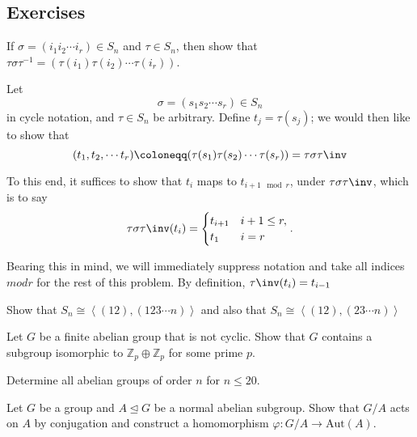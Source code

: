 \subsection{Exercises}

\begin{problem}[Hungerford 1.6.3]
If $\sigma = (i_1 i_2 \cdots i_r) \in S_n$ and $\tau \in S_n$, then show that $\tau\sigma\tau^{-1} = (\tau(i_1) \tau(i_2) \cdots \tau(i_r))$.
\end{problem}

\begin{solution}
  Let $$\sigma = (s_1 s_2 \cdots s_r) \in S_n$$ in cycle notation, and $\tau \in S_n$ be arbitrary. Define $t_j = \tau(s_j)$; we would then like to show that $$(t_1, t_2, \cdots t_r) \coloneqq (\tau(s_1) \tau(s_2) \cdots \tau(s_r)) = \tau\sigma\tau\inv$$

  To this end, it suffices to show that $t_i$ maps to $t_{i+1 \mod r}$, under $\tau\sigma\tau\inv$, which is to say
  $$
  \tau\sigma\tau\inv(t_i) =
  \begin{cases}
    t_{i+1} & i+1 \leq r, \\
    t_1 & i = r
  \end{cases}.
  $$

  Bearing this in mind, we will immediately suppress notation and take all indices $mod r$ for the rest of this problem.
  By definition, $\tau\inv(t_i) = t_{i-1}$

\end{solution}

\begin{problem}[Hungerford 1.6.4]
\label{prob:1.2}
Show that $S_n \cong \left\langle (12), (123\cdots n)\right\rangle$ and also that $S_n \cong \left\langle (12), (23\cdots n)\right\rangle$
\end{problem}

\begin{problem}[Hungerford 2.2.1]
\label{prob:1.3}
Let $G$ be a finite abelian group that is not cyclic. Show that $G$ contains a subgroup isomorphic to $\mathbb{Z}_p \oplus \mathbb{Z}_p$ for some prime $p$.
\end{problem}

\begin{problem}[Hungerford 2.2.12.b]
\label{prob:1.4}
Determine all abelian groups of order $n$ for $n\leq 20$.
\end{problem}

\begin{problem}[Hungerford 2.4.1]
\label{prob:1.5}
Let $G$ be a group and $A \trianglelefteq G$ be a normal abelian subgroup. Show that $G/A$ acts on $A$ by conjugation and construct a homomorphism $\varphi: G/A \to \mathrm{Aut}(A)$.
\end{problem}

